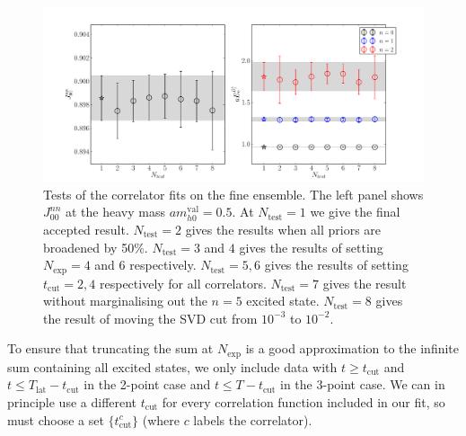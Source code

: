 \begin{figure}[htb!]
  \begin{center}
  \includegraphics[width=1.1\textwidth]{images/BsDsstar/fittests_fine.pdf}
  \caption{Tests of the correlator fits on the fine ensemble. The left panel shows $J_{00}^{nn}$ at the heavy mass $am_{h0}^{\text{val}}=0.5$. At $N_{\text{test}}=1$ we give the final accepted result. $N_{\text{test}}=2$ gives the results when all priors are broadened by 50\%. $N_{\text{test}}=3$ and $4$ gives the results of setting $N_{\text{exp}}=4$ and $6$ respectively. $N_{\text{test}}=5,6$ gives the results of setting $t_{\text{cut}}=2,4$ respectively for all correlators. $N_{\text{test}}=7$ gives the result without marginalising out the $n=5$ excited state. $N_{\text{test}}=8$ gives the result of moving the SVD cut from $10^{-3}$ to $10^{-2}$. \label{fig:corr_fit_tests}}
  \end{center}
  \vspace{-10pt}
\end{figure}

To ensure that truncating the sum at $N_{\text{exp}}$ is a good approximation to the infinite sum containing all excited states, we only include data with  $t \geq t_{\text{cut}}$ and $t \leq T_{\text{lat}}-t_{\text{cut}}$ in the 2-point case and $t \leq T-t_{\text{cut}}$ in the 3-point case. We can in principle use a different $t_{\text{cut}}$ for every correlation function included in our fit, so must choose a set $\{ t_{\text{cut}}^{c}\}$ (where $c$ labels the correlator).

